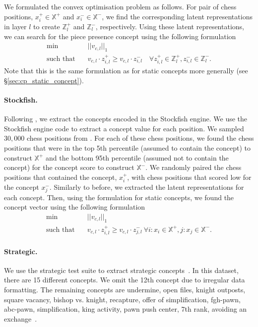 \documentclass{article}
\def\Xset{\mathbb{X}}
\def\Zset{\mathbb{Z}}
\def\vcld{v_{c,l}\cdot}
\def\vcl{v_{c,l}}
\def\st{\textrm{such that}}
\begin{document}
We formulated the convex optimisation problem as follows. For pair of chess positions, $x_{i}^+ \in \Xset^{+}$ and $x_{i}^- \in \Xset^{-}$, we find the corresponding latent representations in layer $l$ to create $\Zset_l^{+}$ and $\Zset_l^{-}$, respectively. Using these latent representations, we can search for the piece presence concept using the following formulation
\begin{align}
 \min & \quad ||\vcl||_1 \\
 \st  & \quad \vcld z_{i,l}^+ \geq \vcld z_{i,l}^- \quad  \forall z_{i,l}^+ \in \Zset_l^+, z_{i,l}^- \in \Zset_l^-.
\end{align}
Note that this is the same formulation as for static concepts more generally (see \S\ref{sec:cp_static_concept}). 

\paragraph{Stockfish.}
Following \cite{mcgrath2022acquisition}, we extract the concepts encoded in the Stockfish engine. We use the Stockfish engine code to extract a concept value for each position.  We sampled $30,000$ chess positions from \cite{chessbase}. For each of these chess positions, we found the chess positions that were in the top 5th percentile (assumed to contain the concept) to construct $\Xset^+$ and the bottom 95th percentile (assumed not to contain the concept) for the concept score to construct $\Xset^-$. 
We randomly paired the chess positions that contained the concept, $x_{i}^+$, with chess positions that scored low for the concept $x_j^{-}$. 
Similarly to before, we extracted the latent representations for each concept. 
Then, using the formulation for static concepts, we found the concept vector using the following formulation
\begin{align}
 \min & \quad ||\vcl||_1 \\
 \st & \quad \vcld z_{i, l}^+ \geq \vcld z_{j, l}^- \ \forall i:x_i \in \Xset^+, j:x_j \in \Xset^-.
\end{align}

\paragraph{Strategic.}
We use the strategic test suite to extract strategic concepts~\citep{sts}.  
In this dataset, there are 15 different concepts. We omit the 12th concept due to irregular data formatting. The remaining concepts are undermine, open files, knight outposts, square vacancy, bishop vs. knight, recapture, offer of simplification, fgh-pawn, abc-pawn, simplification, king activity, pawn push center, 7th rank, avoiding an exchange~\citep[see][for further details]{sts}.
\end{document}
